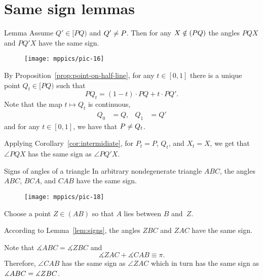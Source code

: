 \section{Same sign lemmas}



\begin{thm}[\abs]{Lemma}\label{lem:signs}
Assume $Q'\in [PQ)$ and $Q'\z\ne P$.
Then for any $X\z\notin (PQ)$ the angles $PQX$ and $PQ'X$ have the same sign. 
\end{thm}

{

\begin{wrapfigure}{r}{33mm}
\centering
\vskip-5mm
\texttt{[image: mppics/pic-16]}
\end{wrapfigure}

By Proposition~\ref{prop:point-on-half-line},
for any $t\in [0,1]$ there is a unique point $Q_t\in[PQ)$ 
such that 
\[PQ_t=  (1-t)\cdot PQ+t\cdot PQ'.\]
Note that the map $t\mapsto Q_t$ is continuous,
\begin{align*}
Q_0&=Q,
&
Q_1&=Q'
\end{align*}
and for any $t\in [0,1]$, 
we have that $P\z\ne Q_t$.

}

Applying Corollary~\ref{cor:intermidiate},
for $P_t=P$, $Q_t$, and $X_t=X$, we get that $\angle PQX$ has the same sign as $\angle PQ'X$.
\qeds



\begin{thm}[\abs]{Signs of angles of a triangle}\label{thm:signs-of-triug}
In arbitrary nondegenerate triangle $ABC$,
the angles $ABC$, $BCA$, and $CAB$ have the same sign. 
\end{thm}

{

\begin{wrapfigure}{o}{33mm}
\vskip-4mm
\centering
\texttt{[image: mppics/pic-18]}
\end{wrapfigure}

Choose a point $Z\in (AB)$ so that $A$ lies between $B$ and~$Z$.


According to Lemma~\ref{lem:signs},
the angles $ZBC$ and $ZAC$ have the same sign.


Note that $\measuredangle ABC=\measuredangle ZBC$
and 
$$\measuredangle ZAC+\measuredangle CAB\equiv \pi.$$
Therefore, $\angle CAB$ has the same sign as $\angle ZAC$
which in turn has the same sign as $\measuredangle ABC\z=\measuredangle ZBC$.

}

